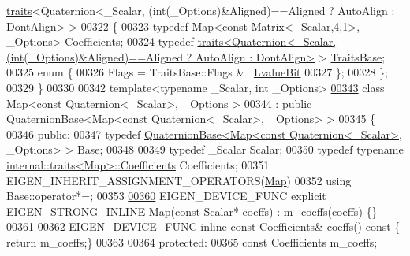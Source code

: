 \begin{DoxyCode}
      \hyperlink{struct_eigen_1_1internal_1_1traits}{traits}<Quaternion<\_Scalar, (int(\_Options)&Aligned)==Aligned ? AutoAlign : DontAlign> >
00322   \{
00323     \textcolor{keyword}{typedef} \hyperlink{group___core___module_class_eigen_1_1_map}{Map<const Matrix<\_Scalar,4,1>}, \_Options> Coefficients;
00324     \textcolor{keyword}{typedef} 
      \hyperlink{struct_eigen_1_1internal_1_1traits}{traits<Quaternion<\_Scalar, (int(\_Options)&Aligned)==Aligned ? AutoAlign : DontAlign>}
       > \hyperlink{struct_eigen_1_1internal_1_1traits}{TraitsBase};
00325     \textcolor{keyword}{enum} \{
00326       Flags = TraitsBase::Flags & ~\hyperlink{group__flags_gae2c323957f20dfdc6cb8f44428eaec1a}{LvalueBit}
00327     \};
00328   \};
00329 \}
00330 
00342 \textcolor{keyword}{template}<\textcolor{keyword}{typename} \_Scalar, \textcolor{keywordtype}{int} \_Options>
\hyperlink{group___geometry___module}{00343} \textcolor{keyword}{class }\hyperlink{group___core___module_class_eigen_1_1_map}{Map}<const \hyperlink{group___geometry___module_class_eigen_1_1_quaternion}{Quaternion}<\_Scalar>, \_Options >
00344   : \textcolor{keyword}{public} \hyperlink{group___geometry___module_class_eigen_1_1_quaternion_base}{QuaternionBase}<Map<const Quaternion<\_Scalar>, \_Options> >
00345 \{
00346   \textcolor{keyword}{public}:
00347     \textcolor{keyword}{typedef} \hyperlink{group___geometry___module_class_eigen_1_1_quaternion_base}{QuaternionBase<Map<const Quaternion<\_Scalar>}, 
      \_Options> > Base;
00348 
00349     \textcolor{keyword}{typedef} \_Scalar Scalar;
00350     \textcolor{keyword}{typedef} \textcolor{keyword}{typename} \hyperlink{struct_eigen_1_1internal_1_1traits}{internal::traits<Map>::Coefficients} Coefficients;
00351     EIGEN\_INHERIT\_ASSIGNMENT\_OPERATORS(\hyperlink{group___core___module_class_eigen_1_1_map}{Map})
00352     \textcolor{keyword}{using} Base::operator*=;
00353 
\hyperlink{group___geometry___module_a8b321eb2bf9a4e4b76465564e80f212b}{00360}     EIGEN\_DEVICE\_FUNC \textcolor{keyword}{explicit} EIGEN\_STRONG\_INLINE \hyperlink{group___geometry___module_a8b321eb2bf9a4e4b76465564e80f212b}{Map}(\textcolor{keyword}{const} Scalar* coeffs) : m\_coeffs(coeffs) \{\}
00361 
00362     EIGEN\_DEVICE\_FUNC \textcolor{keyword}{inline} \textcolor{keyword}{const} Coefficients& coeffs()\textcolor{keyword}{ const }\{ \textcolor{keywordflow}{return} m\_coeffs;\}
00363 
00364   \textcolor{keyword}{protected}:
00365     \textcolor{keyword}{const} Coefficients m\_coeffs;

\end{DoxyCode}
